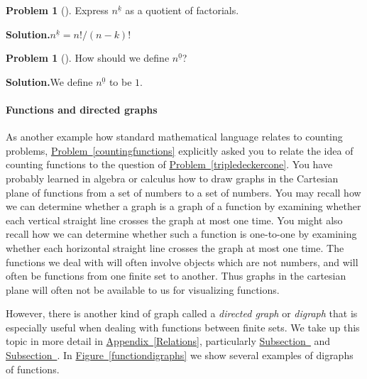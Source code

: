 \documentclass[10pt,]{book}
\theoremstyle{plain}
\theoremstyle{definition}
\newtheorem{activity}[project]{Problem}
\theoremstyle{definition}
\numberwithin{equation}{chapter}
\begin{document}
\begin{activity}[]\label{activity-21}
Express \(n^{\underline{k}}\) as a quotient of factorials.%
\par\medskip\noindent%
\textbf{Solution.}\quad \(n^{\underline{k}}=n!/(n-k)!\)%
\end{activity}
\begin{activity}[]\label{activity-22}
How should we define \(n^{\underline{0}}\)?%
\par\medskip\noindent%
\textbf{Solution.}\quad We define \(n^{\underline{0}}\) to be \(1\).%
\end{activity}
\typeout{************************************************}
\typeout{************************************************}
\paragraph[{Functions and directed graphs}]{Functions and directed graphs}\hypertarget{paragraphs-2}{}
As another example how standard mathematical language relates to counting problems, \hyperref[countingfunctions]{Problem~\ref{countingfunctions}} explicitly asked you to relate the idea of counting functions to the question of \hyperref[tripledeckercone]{Problem~\ref{tripledeckercone}}. You have probably learned in algebra or calculus how to draw graphs in the Cartesian plane of functions from a set of numbers to a set of numbers. You may recall how we can determine whether a graph is a graph of a function by examining whether each vertical straight line crosses the graph at most one time. You might also recall how we can determine whether such a function is one-to-one by examining whether each horizontal straight line crosses the graph at most one time. The functions we deal with will often involve objects which are not numbers, and will often be functions from one finite set to another. Thus graphs in the cartesian plane will often not be available to us for visualizing functions.%
\par
However, there is another kind of graph called a \emph{directed graph} or \emph{digraph} that is especially useful when dealing with functions between finite sets. We take up this topic in more detail in \hyperref[Relations]{Appendix~\ref{Relations}}, particularly \hyperref[relationdigraph]{Subsection~} and \hyperref[digraphsoffunctions]{Subsection~}. In \hyperref[functiondigraphs]{Figure~\ref{functiondigraphs}} we show several examples of digraphs of functions.%
\end{document}
